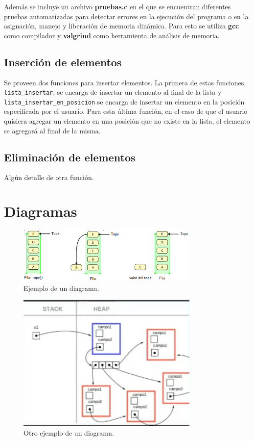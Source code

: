 \documentclass[titlepage,a4paper]{article}
\begin{document}
Además se incluye un archivo \textbf{pruebas.c} en el que se encuentran diferentes pruebas automatizadas para detectar errores en la ejecución del programa o en la asignación, manejo y liberación de memoria dinámica. Para esto se utiliza \textbf{gcc} como compilador y \textbf{valgrind} como herramienta de análisis de memoria.


\subsection{Inserción de elementos}
Se proveen dos funciones para insertar elementos. La primera de estas funciones, \lstinline{lista_insertar}, se encarga de insertar un elemento al final de la lista y \lstinline{lista_insertar_en_posicion} se encarga de insertar un elemento en la posición especificada por el usuario. Para esta última función, en el caso de que el usuario quisiera agregar un elemento en una posición que no existe en la lista, el elemento se agregará al final de la misma.



\subsection{Eliminación de elementos}
Algún detalle de otra función.

\section{Diagramas}\label{sec:diagramas}

\begin{figure}[H]
\centering
\includegraphics[width=0.8\textwidth]{diagrama1.png}
\caption{\label{fig:seq01}Ejemplo de un diagrama.}
\end{figure}


\begin{figure}[H]
\centering
\includegraphics[width=0.8\textwidth]{diagrama2.png}
\caption{\label{fig:seq02}Otro ejemplo de un diagrama.}
\end{figure}
\end{document}

